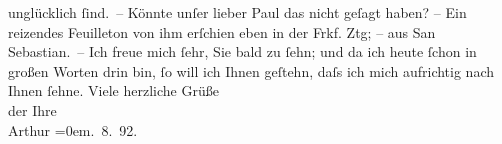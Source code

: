 \begin{ledgroupsized}[t]{13cm}
               unglücklich ſind. –\pend
           \pstart
           Könnte unſer lieber Paul das nicht geſagt
               haben? – Ein reizendes Feuilleton von ihm erſchien eben in der Frkf. Ztg; – aus San Sebastian. –\pend
           \pstart
           Ich freue mich ſehr, Sie bald zu ſehn; und da ich heute ſchon in großen Worten drin
               bin, ſo will ich Ihnen geſtehn, daſs ich mich aufrichtig nach Ihnen ſehne.\pend
           \pstart
           {\pb} Viele herzliche Grüße{\\[\baselineskip]}der Ihre{\\[\baselineskip]}\spacefill\mbox{Arthur}\pend
           \leftskip=0em{}. 8. 92.\pend
           
         
         \endnumbering{}\end{ledgroupsized}  \newcommand{\dateiname}{L00116}\newcommand{\titel}{Arthur Schnitzler an Richard Beer-Hofmann, 22. 8. 1892}\newcommand{\editorInnen}{Martin Anton Müller und Gerd-Hermann Susen}
      
